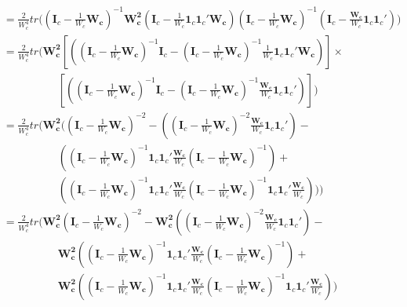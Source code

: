 \begin{equation}
    \begin{split}
        & = \frac{2}{W^4_c} tr\Bigg(  \left(\mathbf{I}_c - \frac{1}{W_c} \mathbf{W_c} \right)^{-1} \mathbf{W^2_c} \left(\mathbf{I}_c  - \frac{1 }{W_c}  \mathbf{1}_c\mathbf{1}_c'\mathbf{W_c} \right)   \left(\mathbf{I}_c - \frac{1}{W_c} \mathbf{W_c} \right)^{-1}   \left(\mathbf{I}_c - \frac{\mathbf{W_c}}{W_c}  \mathbf{1}_c\mathbf{1}_c' \right)   \Bigg) \\   
        & = \frac{2}{W^4_c} tr\Bigg( \mathbf{W^2_c} \left[   \left(\left(\mathbf{I}_c - \frac{1}{W_c} \mathbf{W_c} \right)^{-1}\mathbf{I}_c  - \left(\mathbf{I}_c - \frac{1}{W_c} \mathbf{W_c} \right)^{-1}\frac{1 }{W_c}  \mathbf{1}_c\mathbf{1}_c'\mathbf{W_c} \right) \right] \times \\
        & \quad \quad \quad \quad \quad\left[    \left(\left(\mathbf{I}_c - \frac{1}{W_c} \mathbf{W_c} \right)^{-1}\mathbf{I}_c - \left(\mathbf{I}_c - \frac{1}{W_c} \mathbf{W_c} \right)^{-1}\frac{\mathbf{W_c}}{W_c}  \mathbf{1}_c\mathbf{1}_c' \right) \right]   \Bigg) \\
        & = \frac{2}{W^4_c} tr\Bigg( \mathbf{W^2_c} \bigg(  \left(\mathbf{I}_c - \frac{1}{W_c} \mathbf{W_c} \right)^{-2}  - \left(\left(\mathbf{I}_c - \frac{1}{W_c} \mathbf{W_c} \right)^{-2}\frac{\mathbf{W_c} }{W_c}  \mathbf{1}_c\mathbf{1}_c' \right) - \\
        & \quad \quad \quad \quad \quad  \left(\left(\mathbf{I}_c - \frac{1}{W_c} \mathbf{W_c} \right)^{-1} \mathbf{1}_c\mathbf{1}_c'\frac{\mathbf{W_c}}{W_c}\left(\mathbf{I}_c - \frac{1}{W_c} \mathbf{W_c} \right)^{-1}  \right) + \\
        & \quad \quad \quad \quad \quad     \left(\left(\mathbf{I}_c - \frac{1}{W_c} \mathbf{W_c} \right)^{-1}  \mathbf{1}_c\mathbf{1}_c'\frac{\mathbf{W_c}}{W_c} \left(\mathbf{I}_c - \frac{1}{W_c} \mathbf{W_c} \right)^{-1} \mathbf{1}_c\mathbf{1}_c'\frac{\mathbf{W_c}}{W_c} \right)  \bigg)   \Bigg) \\
        & = \frac{2}{W^4_c} tr\Bigg(   \mathbf{W^2_c}\left(\mathbf{I}_c - \frac{1}{W_c} \mathbf{W_c} \right)^{-2}  - \mathbf{W^2_c}\left(\left(\mathbf{I}_c - \frac{1}{W_c} \mathbf{W_c} \right)^{-2}\frac{\mathbf{W_c} }{W_c}  \mathbf{1}_c\mathbf{1}_c' \right) - \\
        & \quad \quad \quad \quad \quad  \mathbf{W^2_c}\left(\left(\mathbf{I}_c - \frac{1}{W_c} \mathbf{W_c} \right)^{-1} \mathbf{1}_c\mathbf{1}_c'\frac{\mathbf{W_c}}{W_c}\left(\mathbf{I}_c - \frac{1}{W_c} \mathbf{W_c} \right)^{-1}  \right) + \\
        & \quad \quad \quad \quad \quad     \mathbf{W^2_c}\left(\left(\mathbf{I}_c - \frac{1}{W_c} \mathbf{W_c} \right)^{-1}  \mathbf{1}_c\mathbf{1}_c'\frac{\mathbf{W_c}}{W_c} \left(\mathbf{I}_c - \frac{1}{W_c} \mathbf{W_c} \right)^{-1} \mathbf{1}_c\mathbf{1}_c'\frac{\mathbf{W_c}}{W_c} \right)     \Bigg) \\
    \end{split}
    \nonumber
\end{equation}
